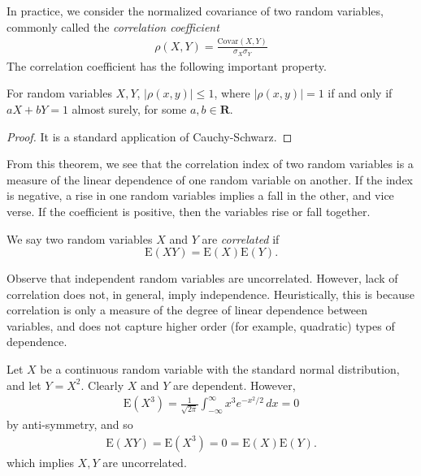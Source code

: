 In practice, we consider the normalized covariance of two random variables,
commonly called the \emph{correlation coefficient}
\begin{align*}
	\rho(X,Y) = \frac{\mathrm{Covar}(X,Y)}{\sigma_X \sigma_Y}
\end{align*}
The correlation coefficient has the following important property.
\begin{theorem}
	For random variables $X, Y$, $|\rho(x,y)| \le 1$, where $|\rho(x,y)| = 1$ 
	if and
	only if $aX + bY = 1$ almost surely, for some $a,b \in \mathbf{R}$. 
\end{theorem}
\begin{proof}
	It is a standard application of Cauchy-Schwarz.
\end{proof}
From this theorem, we see that the correlation index of two random variables is
a measure of the linear dependence of one random variable on another. If the
index is negative, a rise in one random variables implies a fall in the other,
and vice verse. If the coefficient is positive, then the variables rise or fall
together.
\begin{definition}
	We say two random variables $X$ and $Y$ are \emph{correlated} 
	if \[\mathrm{E}(XY) = \mathrm{E}(X)\mathrm{E}(Y).\]
\end{definition}
Observe that independent random variables are uncorrelated. However,
lack of correlation does not, in general, imply independence. Heuristically, 
this is
because correlation is only a measure of the degree of linear dependence
between variables, and does not capture higher order (for example, quadratic)
types of dependence. 
\begin{example}
	Let $X$ be a continuous random variable with the standard normal 
	distribution,
	and let $Y = X^2$. Clearly $X$ and $Y$ are dependent. However,
	\begin{align*}
		\mathrm{E}(X^3) = \frac{1}{\sqrt{2 \pi}}\int_{-\infty}^{\infty} x^3 e^{-x^2/2} 
		\, dx = 0
	\end{align*}
	by anti-symmetry, and so
	\begin{align*}
		\mathrm{E}(XY) = \mathrm{E}(X^3) = 0 = \mathrm{E}(X) \mathrm{E}(Y).
	\end{align*}
	which implies $X, Y$ are uncorrelated.
\end{example}
